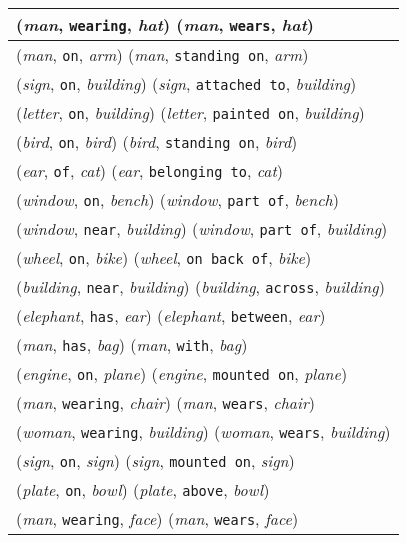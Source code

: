 \documentclass[runningheads]{llncs}
\begin{document}
{\begin{longtable}{ l }
(\textit{man}, \texttt{wearing}, \textit{hat})  (\textit{man}, \texttt{wears}, \textit{hat}) \\ \hline
(\textit{man}, \texttt{on}, \textit{arm})  (\textit{man}, \texttt{standing on}, \textit{arm}) \\ \hline
(\textit{sign}, \texttt{on}, \textit{building})  (\textit{sign}, \texttt{attached to}, \textit{building}) \\ \hline
(\textit{letter}, \texttt{on}, \textit{building})  (\textit{letter}, \texttt{painted on}, \textit{building}) \\ \hline
(\textit{bird}, \texttt{on}, \textit{bird})  (\textit{bird}, \texttt{standing on}, \textit{bird}) \\ \hline
(\textit{ear}, \texttt{of}, \textit{cat})  (\textit{ear}, \texttt{belonging to}, \textit{cat}) \\ \hline
(\textit{window}, \texttt{on}, \textit{bench})  (\textit{window}, \texttt{part of}, \textit{bench}) \\ \hline
(\textit{window}, \texttt{near}, \textit{building})  (\textit{window}, \texttt{part of}, \textit{building}) \\ \hline
(\textit{wheel}, \texttt{on}, \textit{bike})  (\textit{wheel}, \texttt{on back of}, \textit{bike}) \\ \hline
(\textit{building}, \texttt{near}, \textit{building})  (\textit{building}, \texttt{across}, \textit{building}) \\ \hline
(\textit{elephant}, \texttt{has}, \textit{ear})  (\textit{elephant}, \texttt{between}, \textit{ear}) \\ \hline
(\textit{man}, \texttt{has}, \textit{bag})  (\textit{man}, \texttt{with}, \textit{bag}) \\ \hline
(\textit{engine}, \texttt{on}, \textit{plane})  (\textit{engine}, \texttt{mounted on}, \textit{plane}) \\ \hline
(\textit{man}, \texttt{wearing}, \textit{chair})  (\textit{man}, \texttt{wears}, \textit{chair}) \\ \hline
(\textit{woman}, \texttt{wearing}, \textit{building})  (\textit{woman}, \texttt{wears}, \textit{building}) \\ \hline
(\textit{sign}, \texttt{on}, \textit{sign})  (\textit{sign}, \texttt{mounted on}, \textit{sign}) \\ \hline
(\textit{plate}, \texttt{on}, \textit{bowl})  (\textit{plate}, \texttt{above}, \textit{bowl}) \\ \hline
(\textit{man}, \texttt{wearing}, \textit{face})  (\textit{man}, \texttt{wears}, \textit{face}) \\ \hline

\end{longtable}}
\end{document}
